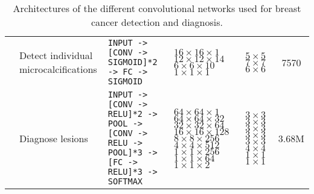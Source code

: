 \begin{landscape}
\begin{table}
\begin{tabular}{cp{3.3cm}p{7cm}p{2cm}p{1.1cm}c}
		\cite{Ge2006}& Detect individual microcalcifications & \texttt{INPUT -> [CONV -> SIGMOID]*2 -> FC -> SIGMOID} & $16\times 16 \times 1$ \newline $12 \times 12 \times 14$\newline $6\times 6 \times 10$\newline $1 \times 1 \times 1$ & $5 \times 5$\newline $7 \times 7$ \newline $6 \times 6$& 7570 \\
		\cite{Agarwal2015}& Diagnose lesions & \texttt{INPUT -> [CONV -> RELU]*2 -> POOL -> [CONV -> RELU -> POOL]*3 -> [FC -> RELU]*3 -> SOFTMAX} & $64\times 64 \times 1$ \newline $64 \times 64 \times 32$\newline $32\times 32 \times 64$\newline $16 \times 16 \times 128$ \newline $8 \times 8 \times 256$ \newline $4 \times 4 \times 512$ \newline $1 \times 1 \times 256$ \newline $1 \times 1 \times 64$ \newline $1 \times 1 \times 2$ & $3 \times 3$ \newline $3 \times 3$ \newline $3 \times 3$ \newline $3 \times 3$ \newline $3 \times 3$ \newline $4 \times 4$ \newline $1 \times 1$ \newline $1 \times 1$ & 3.68M \\
	\hline
	\end{tabular}
	\label{tab:BrCaConvNetArchitectures}
	\caption[Breast cancer convolutional network architectures]{Architectures of the different convolutional networks used for breast cancer detection and diagnosis.}
\end{table}
\end{landscape}
\begin{comment} 
Groups working on convnets for breast cancer:
Georgetown University Medical Center: Shih-Chung Lo, Matthew Freedman, Huai Li
Michigan Medical Center: Heang-Ping Chan, Sahiner, Hadjiiski, Helvie, Gurcan, Wei j and Ge, J
University of chicago (MTANN): Suzuki Kenji (not quite convnets)


Other deep learning applications:
Cruz-Roa mitosis detection in breast cancer histology images,
Ciresan similar

CAD review:
Tang2009
2013 breast cancer diagnosis a review or other good review.
Work at Tec.
\end{comment}



